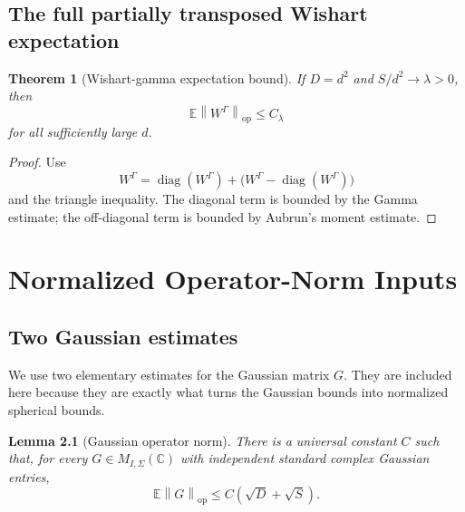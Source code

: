 \documentclass[11pt,oneside]{book}
\newtheorem{theorem}{Theorem}[chapter]
\newtheorem{lemma}[theorem]{Lemma}
\DeclareMathOperator{\diag}{diag}
\newcommand{\C}{\mathbb C}
\newcommand{\E}{\mathbb E}
\newcommand{\1}{\mathbf 1}
\newcommand{\GammaPT}{\Gamma}
\newcommand{\op}{\mathrm{op}}
\newcommand{\norm}[1]{\left\|#1\right\|}
\begin{document}
\section{The full partially transposed Wishart expectation}

\begin{theorem}[Wishart-gamma expectation bound]
If \(D=d^2\) and \(S/d^2\to\lambda>0\), then
\[
  \E\norm{W^{\GammaPT}}_{\op}\le C_\lambda
\]
for all sufficiently large \(d\).
\end{theorem}

\begin{proof}
Use
\[
  W^{\GammaPT}
  =
  \diag(W^{\GammaPT})
  +
  \bigl(W^{\GammaPT}-\diag(W^{\GammaPT})\bigr)
\]
and the triangle inequality.  The diagonal term is bounded by the Gamma
estimate; the off-diagonal term is bounded by Aubrun's moment estimate.
\end{proof}

\chapter{Normalized Operator-Norm Inputs}

\section{Two Gaussian estimates}

We use two elementary estimates for the Gaussian matrix \(G\).  They are
included here because they are exactly what turns the Gaussian bounds into
normalized spherical bounds.

\begin{lemma}[Gaussian operator norm]
There is a universal constant \(C\) such that, for every
\(G\in M_{I,\Sigma}(\C)\) with independent standard complex Gaussian entries,
\[
  \E\norm G_{\op}\le C(\sqrt D+\sqrt S).
\]
\end{lemma}
\end{document}
